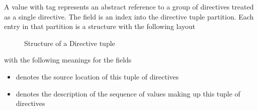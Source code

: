 A  value with tag  represents an abstract reference to a group of directives treated as a single directive.
The  field is an index into the directive tuple partition.
Each entry in that partition is a structure with the following layout
%
\begin{figure}[H]
    \centering
    \caption{Structure of a Directive tuple}
    \label{fig:ifc:DirSort:Tuple}
\end{figure}
%
with the following meanings for the fields
\begin{itemize}
    \item {} denotes the source location of this tuple of directives
    \item {} denotes the description of the sequence of  values making up this tuple of directives 
\end{itemize}

